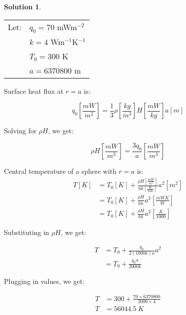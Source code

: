 \documentclass[titlepage, 11pt]{article}
\theoremstyle{definition}
\newtheorem*{solution}{Solution}
\begin{document}
\begin{solution}\ \\

\begin{tabular}{ll}
Let: & $q_{0}=70$    mWm$^{-2}$\\
     & $k=4$         Wm$^{-1}$K$^{-1}$\\
     & $T_{0}=300$   K\\ 
     & $a = 6370800$ m\\ 
\end{tabular}\vspace{\baselineskip}

Surface heat flux at $r = a$ is:

$${q}_{0}\left[ \frac{mW}{m^2} \right] = \frac{1}{3} \rho \left[\frac{kg}{{m}^{3}}\right] H\left[\frac{mW}{kg}\right] a\left[m\right]$$ 

Solving for $\rho H$, we get:

$$\rho H \left[ \frac{mW}{m^3} \right] = \frac{3{q}_{0}}{a}\left[\frac{mW}{m^3} \right]$$

Central temperature of a sphere with $r = a$ is:
\begin{align*}
T\left[K \right] & = {T}_{0}\left[ K \right] + \frac{\rho H\left[\frac{mW}{m^3} \right]}{6k\left[ \frac{W}{m K} \right]} {a}^{2}\left[m^2 \right]\\
& = {T}_{0}\left[ K \right] + \frac{\rho H}{6k} {a}^{2} \left[\frac{mWK}{W} \right]\\
& = {T}_{0}\left[ K \right] + \frac{\rho H}{6k} {a}^{2} \left[\frac{K}{1000} \right]
\end{align*}

Substituting in $\rho H$, we get:

\begin{align*}
T & = {T}_{0} + \frac{{q}_{0}}{2(1000k)a} {a}^{2}\\
& = {T}_{0} + \frac{{q}_{0}a}{2000k}
\end{align*}

Plugging in values, we get:

\begin{align*}
T & = 300 + \frac{70\times6370800}{2000\times4} \\
T & = \boxed{56044.5 \ K}
\end{align*}

\end{solution}

\newpage
\end{document}
